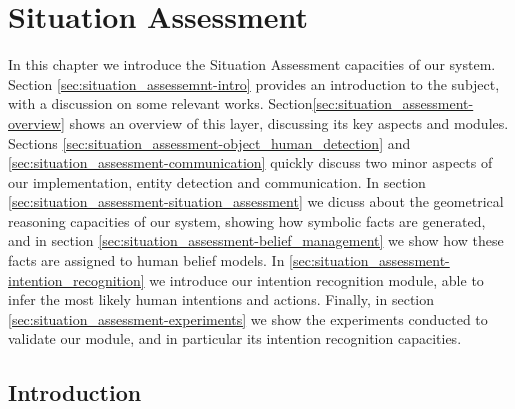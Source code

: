 
\chapter{Situation Assessment} %

\label{chap-situation_assessment} %


In this chapter we introduce the Situation Assessment capacities of our system. Section \ref{sec:situation_assessemnt-intro} provides an introduction to the subject, with a discussion on some relevant works. Section\ref{sec:situation_assessment-overview} shows an overview of this layer, discussing its key aspects and modules. Sections \ref{sec:situation_assessment-object_human_detection} and \ref{sec:situation_assessment-communication} quickly discuss two minor aspects of our implementation, entity detection and communication. In section \ref{sec:situation_assessment-situation_assessment} we dicuss about the geometrical reasoning capacities of our system, showing how symbolic facts are generated, and in section \ref{sec:situation_assessment-belief_management} we show how these facts are assigned to human belief models. In \ref{sec:situation_assessment-intention_recognition} we introduce our intention recognition module, able to infer the most likely human intentions and actions. Finally, in section \ref{sec:situation_assessment-experiments} we show the experiments conducted to validate our module, and in particular its intention recognition capacities.

\section{Introduction}
\label{sec:situation_assessment-intro}

